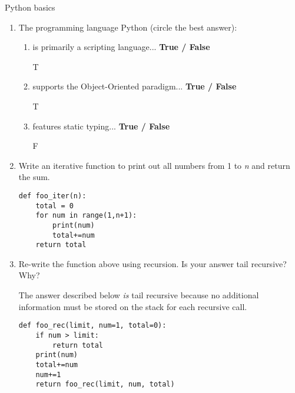 Python basics
\begin{enumerate}

\item The programming language Python (circle the best answer):
	\begin{enumerate}
		\item is primarily a scripting language...
								\hspace{42mm}\textbf{True / False}
								\hspace{10mm}\begin{answer} T \end{answer}
		\item supports the Object-Oriented paradigm...
								\hspace{29mm}\textbf{True / False}
								\hspace{10mm}\begin{answer} T \end{answer}
		\item features static typing...
								\hspace{60mm}\textbf{True / False}
								\hspace{10mm}\begin{answer} F \end{answer}
	\end{enumerate}


\item Write an iterative function to print out all numbers from 1 to \emph{n} and return the sum.

\begin{answer}
\begin{lstlisting}
def foo_iter(n):
	total = 0
	for num in range(1,n+1):
		print(num)
		total+=num
	return total
\end{lstlisting}
\end{answer}

\item Re-write the function above using recursion. Is your answer tail recursive?  Why?

\begin{answer}
The answer described below \emph{is} tail recursive because no additional information must be stored on the stack for each recursive call.

\begin{lstlisting}
def foo_rec(limit, num=1, total=0):
	if num > limit:
		return total
	print(num)
	total+=num
	num+=1
	return foo_rec(limit, num, total)
\end{lstlisting}
\end{answer}


\end{enumerate}
